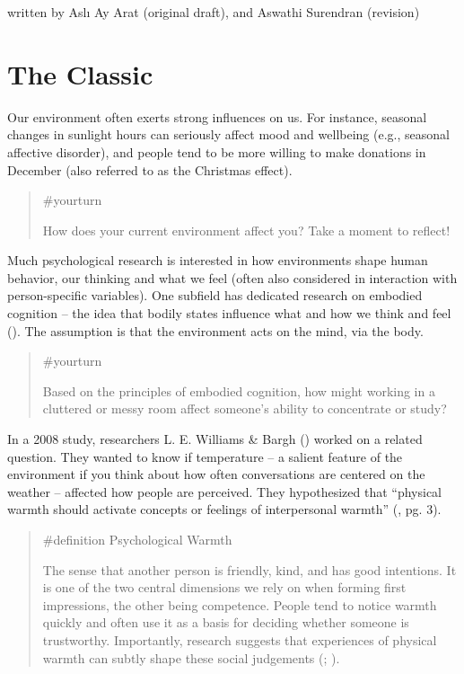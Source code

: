 \documentclass[
  letterpaper,
]{book}
\begin{document}
{written by Aslı Ay Arat (original draft), and Aswathi Surendran
(revision)}

\section{The Classic}\label{the-classic-22}

Our environment often exerts strong influences on us. For instance,
seasonal changes in sunlight hours can seriously affect mood and
wellbeing (e.g., seasonal affective disorder), and people tend to be
more willing to make donations in December (also referred to as the
Christmas effect).

\begin{quote}
{\#yourturn}

How does your current environment affect you? Take a moment to reflect!
\end{quote}

Much psychological research is interested in how environments shape
human behavior, our thinking and what we feel (often also considered in
interaction with person-specific variables). One subfield has dedicated
research on embodied cognition -- the idea that bodily states influence
what and how we think and feel (). The assumption is that the environment acts on the mind,
via the body.

\begin{quote}
{\#yourturn}

Based on the principles of embodied cognition, how might working in a
cluttered or messy room affect someone's ability to concentrate or
study?
\end{quote}

In a 2008 study, researchers L. E. Williams \& Bargh
() worked on a related
question. They wanted to know if temperature -- a salient feature of the
environment if you think about how often conversations are centered on
the weather -- affected how people are perceived. They hypothesized that
``physical warmth should activate concepts or feelings of interpersonal
warmth'' (, pg. 3).

\begin{quote}
\label{def-psychologicalwarmth}{\#definition}
Psychological Warmth

The sense that another person is friendly, kind, and has good
intentions. It is one of the two central dimensions we rely on when
forming first impressions, the other being competence. People tend to
notice warmth quickly and often use it as a basis for deciding whether
someone is trustworthy. Importantly, research suggests that experiences
of physical warmth can subtly shape these social judgements
(;
).
\end{quote}
\end{document}
